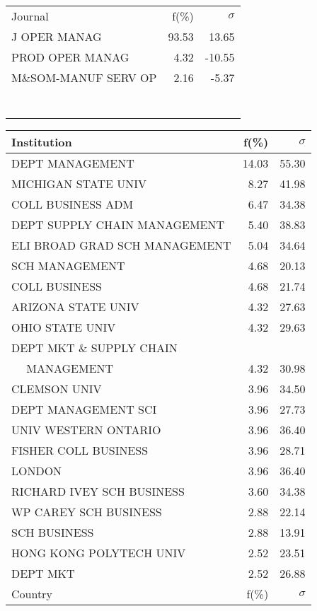 \documentclass[a4paper,11pt]{report}
\begin{document}
\begin{landscape}
\begin{table}[!ht]
{\begin{tabular}{|l r  r|}
 &  & \\
\hline
\hline
Journal & f(\%) & $\sigma$\\
\hline
J OPER MANAG & 93.53 & 13.65\\
PROD OPER MANAG & 4.32 & -10.55\\
M\&SOM-MANUF SERV OP & 2.16 & -5.37\\
 &  & \\
 &  & \\
 &  & \\
 &  & \\
 &  & \\
 &  & \\
 &  & \\
\hline
\end{tabular}
}
{\scriptsize\begin{tabular}{|l r r|}
\hline
Institution & f(\%) & $\sigma$\\
\hline
DEPT MANAGEMENT & 14.03 & 55.30\\
MICHIGAN STATE UNIV & 8.27 & 41.98\\
COLL BUSINESS ADM & 6.47 & 34.38\\
DEPT SUPPLY CHAIN MANAGEMENT & 5.40 & 38.83\\
ELI BROAD GRAD SCH MANAGEMENT & 5.04 & 34.64\\
SCH MANAGEMENT & 4.68 & 20.13\\
COLL BUSINESS & 4.68 & 21.74\\
ARIZONA STATE UNIV & 4.32 & 27.63\\
OHIO STATE UNIV & 4.32 & 29.63\\
DEPT MKT \& SUPPLY CHAIN &  & \\
$\quad$ MANAGEMENT & 4.32 & 30.98\\
CLEMSON UNIV & 3.96 & 34.50\\
DEPT MANAGEMENT SCI & 3.96 & 27.73\\
UNIV WESTERN ONTARIO & 3.96 & 36.40\\
FISHER COLL BUSINESS & 3.96 & 28.71\\
LONDON & 3.96 & 36.40\\
RICHARD IVEY SCH BUSINESS & 3.60 & 34.38\\
WP CAREY SCH BUSINESS & 2.88 & 22.14\\
SCH BUSINESS & 2.88 & 13.91\\
HONG KONG POLYTECH UNIV & 2.52 & 23.51\\
DEPT MKT & 2.52 & 26.88\\
\hline
\hline
Country & f(\%) & $\sigma$\\

\end{tabular}}
\end{table}
\end{landscape}
\end{document}
